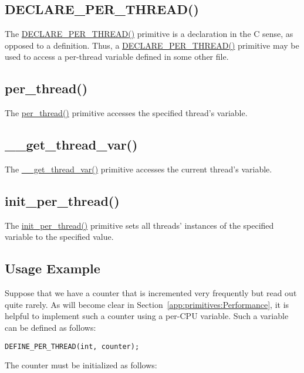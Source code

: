 \subsection{DECLARE\_PER\_THREAD()}

The \url{DECLARE_PER_THREAD()} primitive is a declaration in the C sense,
as opposed to a definition.
Thus, a \url{DECLARE_PER_THREAD()} primitive may be used to access
a per-thread variable defined in some other file.

\subsection{per\_thread()}

The \url{per_thread()} primitive accesses the specified thread's variable.

\subsection{\_\_get\_thread\_var()}

The \url{__get_thread_var()} primitive accesses the current thread's variable.

\subsection{init\_per\_thread()}

The \url{init_per_thread()} primitive sets all threads' instances of
the specified variable to the specified value.

\subsection{Usage Example}

Suppose that we have a counter that is incremented very frequently
but read out quite rarely.
As will become clear in
Section~\ref{app:primitives:Performance},
it is helpful to implement such a counter using a per-CPU variable.
Such a variable can be defined as follows:

\vspace{5pt}
\begin{minipage}[t]{\columnwidth}
\small
\begin{verbatim}
DEFINE_PER_THREAD(int, counter);
\end{verbatim}
\end{minipage}
\vspace{5pt}

The counter must be initialized as follows:

